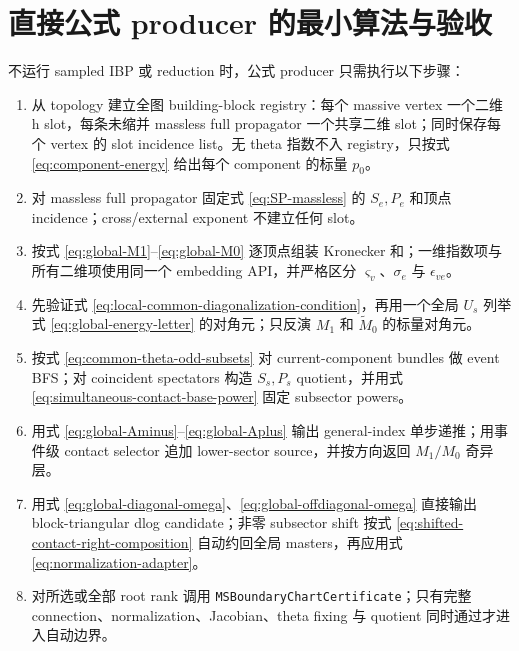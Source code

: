 \documentclass[11pt,a4paper]{ctexart}
\begin{document}
\section{直接公式 producer 的最小算法与验收}

不运行 sampled IBP 或 reduction 时，公式 producer 只需执行以下步骤：
\begin{enumerate}[label=\arabic*.]
  \item 从 topology 建立全图 building-block registry：每个 massive vertex 一个二维 h slot，每条未缩并 massless full propagator 一个共享二维 slot；同时保存每个 vertex 的 slot incidence list。无 theta 指数不入 registry，只按式 \eqref{eq:component-energy} 给出每个 component 的标量 $p_0$。
  \item 对 massless full propagator 固定式 \eqref{eq:SP-massless} 的 $S_e,P_e$ 和顶点 incidence；cross/external exponent 不建立任何 slot。
  \item 按式 \eqref{eq:global-M1}--\eqref{eq:global-M0} 逐顶点组装 Kronecker 和；一维指数项与所有二维项使用同一个 embedding API，并严格区分 $\varsigma_v$、$\sigma_e$ 与 $\epsilon_{ve}$。
  \item 先验证式 \eqref{eq:local-common-diagonalization-condition}，再用一个全局 $U_s$ 列举式 \eqref{eq:global-energy-letter} 的对角元；只反演 $M_1$ 和 $\widetilde M_0$ 的标量对角元。
  \item 按式 \eqref{eq:common-theta-odd-subsets} 对 current-component bundles 做 event BFS；对 coincident spectators 构造 $S_s,P_s$ quotient，并用式 \eqref{eq:simultaneous-contact-base-power} 固定 subsector powers。
  \item 用式 \eqref{eq:global-Aminus}--\eqref{eq:global-Aplus} 输出 general-index 单步递推；用事件级 contact selector 追加 lower-sector source，并按方向返回 $M_1/M_0$ 奇异层。
  \item 用式 \eqref{eq:global-diagonal-omega}、\eqref{eq:global-offdiagonal-omega} 直接输出 block-triangular dlog candidate；非零 subsector shift 按式 \eqref{eq:shifted-contact-right-composition} 自动约回全局 masters，再应用式 \eqref{eq:normalization-adapter}。
  \item 对所选或全部 root rank 调用 \texttt{MSBoundaryChartCertificate}；只有完整 connection、normalization、Jacobian、theta fixing 与 quotient 同时通过才进入自动边界。
\end{enumerate}
\end{document}
